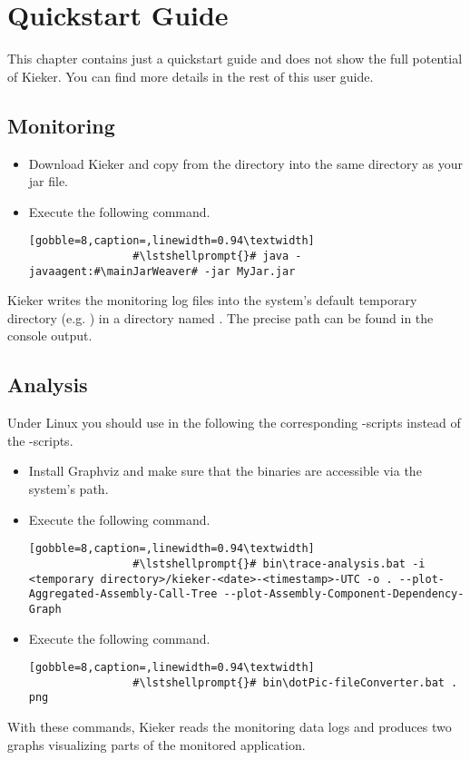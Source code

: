 \chapter{Quickstart Guide}\label{chp:Quickstart-Guide}

	This chapter contains just a quickstart guide and does not show the full potential of Kieker. You can find more details in the rest of this user guide.

	\section{Monitoring}

		\begin{itemize}
			\item Download Kieker and copy \mainJarWeaver{} from the  directory into the same directory as your jar file.
			\item Execute the following command.
			\setBashListing
			\begin{lstlisting}[gobble=8,caption=,linewidth=0.94\textwidth]
				#\lstshellprompt{}# java -javaagent:#\mainJarWeaver# -jar MyJar.jar
			\end{lstlisting} 
		\end{itemize}
	
		\noindent
		Kieker writes the monitoring log files into the system’s default temporary directory (e.g. ) in a directory named . The precise path can be found in the console output.

	\section{Analysis}
	
		Under Linux you should use in the following the corresponding -scripts instead of the -scripts.
	

		\begin{itemize}
			\item Install Graphviz and make sure that the binaries are accessible via the system’s path.
			\item Execute the following command.
			\setBashListing
			\begin{lstlisting}[gobble=8,caption=,linewidth=0.94\textwidth]
				#\lstshellprompt{}# bin\trace-analysis.bat -i <temporary directory>/kieker-<date>-<timestamp>-UTC -o . --plot-Aggregated-Assembly-Call-Tree --plot-Assembly-Component-Dependency-Graph
			\end{lstlisting} 
			\item Execute the following command.
			\setBashListing
			\begin{lstlisting}[gobble=8,caption=,linewidth=0.94\textwidth]
				#\lstshellprompt{}# bin\dotPic-fileConverter.bat . png
			\end{lstlisting} 
		\end{itemize}	
		
		\noindent
		With these commands, Kieker reads the monitoring data logs and produces two graphs visualizing parts of the monitored application. 
		